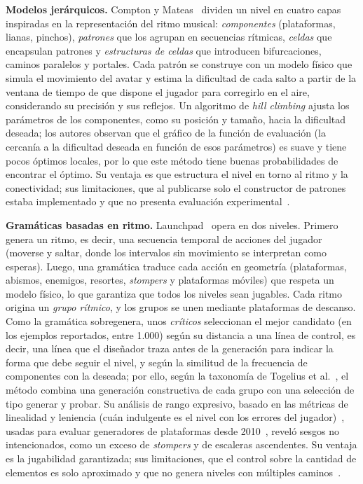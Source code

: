 \documentclass[letter, 10pt]{article}
\begin{document}
\textbf{Modelos jer\'arquicos.} Compton y Mateas~\cite{Compton2006} dividen un nivel en cuatro capas inspiradas en la representaci\'on del ritmo musical: \emph{componentes} (plataformas, lianas, pinchos), \emph{patrones} que los agrupan en secuencias r\'itmicas, \emph{celdas} que encapsulan patrones y \emph{estructuras de celdas} que introducen bifurcaciones, caminos paralelos y portales. Cada patr\'on se construye con un modelo f\'isico que simula el movimiento del avatar y estima la dificultad de cada salto a partir de la ventana de tiempo de que dispone el jugador para corregirlo en el aire, considerando su precisi\'on y sus reflejos. Un algoritmo de \emph{hill climbing} ajusta los par\'ametros de los componentes, como su posici\'on y tama\~no, hacia la dificultad deseada; los autores observan que el gr\'afico de la funci\'on de evaluaci\'on (la cercan\'ia a la dificultad deseada en funci\'on de esos par\'ametros) es suave y tiene pocos \'optimos locales, por lo que este m\'etodo tiene buenas probabilidades de encontrar el \'optimo. Su ventaja es que estructura el nivel en torno al ritmo y la conectividad; sus limitaciones, que al publicarse solo el constructor de patrones estaba implementado y que no presenta evaluaci\'on experimental~\cite{Compton2006}.

\textbf{Gram\'aticas basadas en ritmo.} Launchpad~\cite{Smith2011} opera en dos niveles. Primero genera un ritmo, es decir, una secuencia temporal de acciones del jugador (moverse y saltar, donde los intervalos sin movimiento se interpretan como esperas). Luego, una gram\'atica traduce cada acci\'on en geometr\'ia (plataformas, abismos, enemigos, resortes, \emph{stompers} y plataformas m\'oviles) que respeta un modelo f\'isico, lo que garantiza que todos los niveles sean jugables. Cada ritmo origina un \emph{grupo r\'itmico}, y los grupos se unen mediante plataformas de descanso. Como la gram\'atica sobregenera, unos \emph{cr\'iticos} seleccionan el mejor candidato (en los ejemplos reportados, entre 1.000) seg\'un su distancia a una l\'inea de control, es decir, una l\'inea que el dise\~nador traza antes de la generaci\'on para indicar la forma que debe seguir el nivel, y seg\'un la similitud de la frecuencia de componentes con la deseada; por ello, seg\'un la taxonom\'ia de Togelius et al.~\cite{Togelius2011}, el m\'etodo combina una generaci\'on constructiva de cada grupo con una selecci\'on de tipo generar y probar. Su an\'alisis de rango expresivo, basado en las m\'etricas de linealidad y leniencia (cu\'an indulgente es el nivel con los errores del jugador)~\cite{Smith2011}, usadas para evaluar generadores de plataformas desde 2010~\cite{Summerville2016}, revel\'o sesgos no intencionados, como un exceso de \emph{stompers} y de escaleras ascendentes. Su ventaja es la jugabilidad garantizada; sus limitaciones, que el control sobre la cantidad de elementos es solo aproximado y que no genera niveles con m\'ultiples caminos~\cite{Smith2011}.
\end{document}

